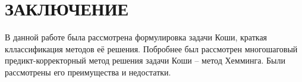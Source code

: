 \section*{ЗАКЛЮЧЕНИЕ}

В данной работе была рассмотрена формулировка задачи Коши,
краткая кллассификация методов её решения. Побробнее был рассмотрен
многошаговый предикт-корректорный метод решения задачи Коши -- метод
Хемминга. Были рассмотрены его преимущества и недостатки.

\pagebreak
